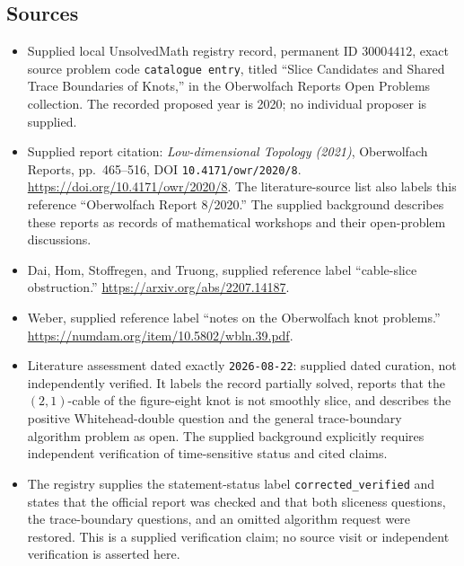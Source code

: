 \documentclass[11pt]{article}
\begin{document}
\subsection{Sources}
\begin{itemize}
\item Supplied local UnsolvedMath registry record, permanent ID \(30004412\), exact source problem code \texttt{catalogue entry}, titled ``Slice Candidates and Shared Trace Boundaries of Knots,'' in the Oberwolfach Reports Open Problems collection. The recorded proposed year is 2020; no individual proposer is supplied.
\item Supplied report citation: \emph{Low-dimensional Topology (2021)}, Oberwolfach Reports, pp.~465--516, DOI \texttt{10.4171/owr/2020/8}. \url{https://doi.org/10.4171/owr/2020/8}. The literature-source list also labels this reference ``Oberwolfach Report 8/2020.'' The supplied background describes these reports as records of mathematical workshops and their open-problem discussions.
\item Dai, Hom, Stoffregen, and Truong, supplied reference label ``cable-slice obstruction.'' \url{https://arxiv.org/abs/2207.14187}.
\item Weber, supplied reference label ``notes on the Oberwolfach knot problems.'' \url{https://numdam.org/item/10.5802/wbln.39.pdf}.
\item Literature assessment dated exactly \texttt{2026-08-22}: supplied dated curation, not independently verified. It labels the record partially solved, reports that the \((2,1)\)-cable of the figure-eight knot is not smoothly slice, and describes the positive Whitehead-double question and the general trace-boundary algorithm problem as open. The supplied background explicitly requires independent verification of time-sensitive status and cited claims.
\item The registry supplies the statement-status label \texttt{corrected\_verified} and states that the official report was checked and that both sliceness questions, the trace-boundary questions, and an omitted algorithm request were restored. This is a supplied verification claim; no source visit or independent verification is asserted here.
\end{itemize}
\end{document}
